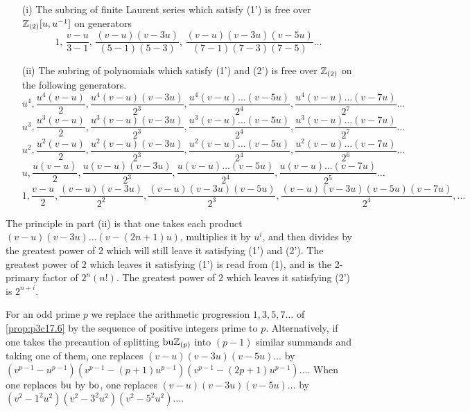 \documentclass[../main]{subfiles}
\begin{document}
\begin{proposition}
\label{prop:p3c17.6} 

\begin{enumerate}
    \item[(i)] The subring of finite Laurent series which satisfy (1') is free over $\mathbb{Z}_{(2)}[u, u^{-1}]$ on generators \[1, \, \frac {v - u} {3 - 1}, \, \frac {(v - u)(v - 3u)} {(5 - 1)(5-3)}, \, \frac {(v - u)(v - 3u)(v - 5u)} {(7 - 1)(7 - 3)(7 - 5)} \ldots\]
    \item[(ii)] The subring of polynomials which satisfy (1') and (2') is free over $\mathbb{Z}_{(2)}$ on the following generators. 
    \[u^4, \frac {u^4(v - u)} 2, \frac {u^4(v - u)(v - 3u)} {2^3}, \frac {u^4(v - u)\ldots(v - 5u)} {2^4}, \frac {u^4(v - u) \ldots (v - 7u)} {2^7} \ldots\] 
    \[u^3, \frac {u^3(v - u)} 2, \frac {u^3(v - u)(v - 3u)} {2^3}, \frac {u^3(v - u)\ldots(v - 5u)} {2^4}, \frac {u^3(v - u) \ldots (v - 7u)} {2^7} \ldots\]
    \[u^2, \frac {u^2(v - u)} 2, \frac {u^2(v - u)(v - 3u)} {2^3}, \frac {u^2(v - u)\ldots(v - 5u)} {2^4}, \frac {u^2(v - u) \ldots (v - 7u)} {2^6} \ldots\]
    \[u, \frac {u(v - u)} 2, \frac {u(v - u)(v - 3u)} {2^3}, \frac {u(v - u)\ldots(v - 5u)} {2^4}, \frac {u(v - u) \ldots (v - 7u)} {2^5} \ldots\]
    \[1, \frac {v - u} 2, \frac {(v - u)(v - 3u)} {2^2}, \frac {(v - u)(v - 3u)(v - 5u)} {2^3}, \frac {(v - u)(v - 3u)(v - 5u)(v - 7u)} {2^4}, \ldots\]
\end{enumerate}
\end{proposition}

The principle in part (ii) is that one takes each product $(v - u)(v - 3u)\ldots(v - (2n + 1)u)$, multiplies it by $u^i$, and then divides by the greatest power of $2$ which will still leave it satisfying (1') and (2'). The greatest power of $2$ which leaves it satisfying (1') is read from (1), and is the 2-primary factor of $2^n(n!)$. The greatest power of $2$ which leaves it satisfying (2') is $2^{n + i}$. 

\begin{remark*}
For an odd prime $p$ we replace the arithmetic progression $1, 3, 5, 7\dots$ of \ref{prop:p3c17.6} by the sequence of positive integers prime to $p$. Alternatively, if one takes the precaution of splitting $\mathrm{bu}\mathbb{Z}_{(p)}$ into $(p - 1)$ similar summands and taking one of them, one replaces $(v - u)(v - 3u)(v - 5u) \ldots$ by $(v^{p - 1} - u^{p - 1}) (v^{p - 1} - (p + 1)u^{p-1}) (v^{p - 1} - (2 p + 1)u^{p - 1}) \ldots$. When one replaces $\mathrm{bu}$ by $\mathrm{bo}$, one replaces $(v - u)(v - 3u)(v - 5u) \ldots$ by $(v^2 - 1^2 u^2)(v^2 - 3^2 u^2) (v^2 - 5^2 u^2)\ldots$. 
\end{remark*}
\end{document}
